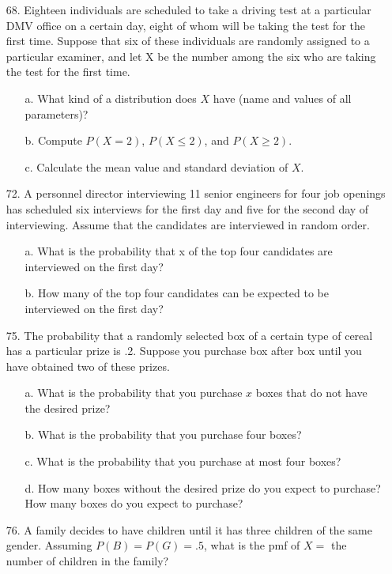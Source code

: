 \documentclass[letterpaper,12pt]{article}
\begin{document}
\maketitle

\begin{enumerate}
  \item[68.]
    Eighteen individuals are scheduled to take a driving test at a particular DMV office on a certain day, eight of whom will be taking the test for the first time. Suppose that six of these individuals are randomly assigned to a particular examiner, and let X be the number among the six who are taking the test for the first time.
    \begin{enumerate}
      \item[a.]
        What kind of a distribution does $X$ have (name and values of all parameters)?
      \item[b.]
        Compute $P(X = 2)$, $P(X \le 2)$, and $P(X \ge 2)$.
      \item[c.]
        Calculate the mean value and standard deviation of $X$.
    \end{enumerate}
  \item[72.]
    A personnel director interviewing 11 senior engineers for four job openings has scheduled six interviews for the first day and five for the second day of interviewing. Assume that the candidates are interviewed in random order.
    \begin{enumerate}
      \item[a.]
        What is the probability that x of the top four candidates are interviewed on the first day?
      \item[b.]
        How many of the top four candidates can be expected to be interviewed on the first day?
    \end{enumerate}
  \item[75.]
    The probability that a randomly selected box of a certain type of cereal has a particular prize is .2. Suppose you purchase box after box until you have obtained two of these prizes.
    \begin{enumerate}
      \item[a.]
        What is the probability that you purchase $x$ boxes that do not have the desired prize?
      \item[b.]
        What is the probability that you purchase four boxes?
      \item[c.]
        What is the probability that you purchase at most four boxes?
      \item[d.]
        How many boxes without the desired prize do you expect to purchase? How many boxes do you expect to purchase?
    \end{enumerate}
  \item[76.]
    A family decides to have children until it has three children of the same gender. Assuming $P(B) = P(G) = .5$, what is the pmf of $X =$ the number of children in the family?
\end{enumerate}
\end{document}
